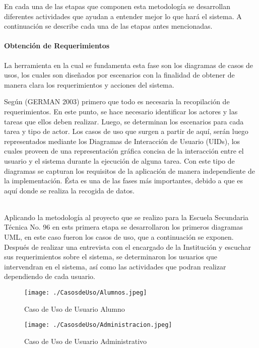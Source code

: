 {\large En cada una de las etapas que componen esta metodología se desarrollan diferentes actividades que ayudan a entender mejor lo que hará el sistema. A continuación se describe cada una de las etapas antes mencionadas. }\\

\paragraph{Obtención de Requerimientos}
{\large La herramienta en la cual se fundamenta esta fase son los diagramas de casos de usos, los cuales son diseñados por escenarios con la finalidad de obtener de manera clara los requerimientos y acciones del sistema.

Según (GERMAN 2003) primero que todo es necesaria la recopilación de requerimientos. En este punto, se hace necesario identificar los actores y las tareas que ellos deben realizar. Luego, se determinan los escenarios para cada tarea y tipo de actor. Los casos de uso que surgen a partir de aquí, serán luego representados mediante los Diagramas de Interacción de Usuario (UIDs), los cuales proveen de una representación gráfica concisa de la interacción entre el usuario y el sistema durante la ejecución de alguna tarea. Con este tipo de diagramas se capturan los requisitos de la aplicación de manera independiente de la implementación. Ésta es una de las fases más importantes, debido a que es aquí donde se realiza la recogida de datos.}\\

{\large Aplicando la metodología al proyecto que se realizo para la Escuela Secundaria Técnica No. 96 en ests primera etapa se desarrollaron los primeros diagramas UML, en este caso fueron los casos de uso, que a continuación se exponen.}\\ 

{\large Después de realizar una entrevista con el encargado de la Institución y escuchar sus requerimientos sobre el sistema, se determinaron los usuarios que intervendran en el sistema, así como las actividades que podran realizar dependiendo de cada usuario. }\\

\begin{figure}[H]	
	\centering
	\texttt{[image: ./CasosdeUso/Alumnos.jpeg]}
	\caption{Caso de Uso de Usuario Alumno}
\end{figure}

\begin{figure}[H]
\centering
	\texttt{[image: ./CasosdeUso/Administracion.jpeg]}
	\caption{Caso de Uso de Usuario Administrativo}	
\end{figure}

